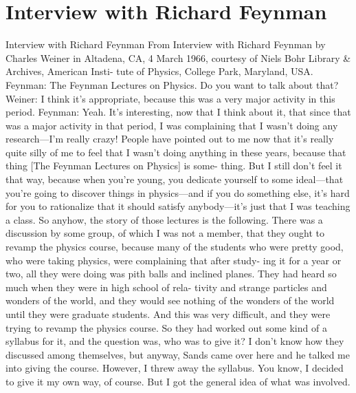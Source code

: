 \documentclass[10pt,oneside]{article}
\begin{document}
\section*{Interview with Richard Feynman}
\label{tips-sec-6-interview-with-richard-feynman}
Interview with Richard Feynman From Interview with Richard Feynman by Charles Weiner in Altadena, CA, 4 March 1966, courtesy of Niels Bohr Library \& Archives, American Insti- tute of Physics, College Park, Maryland, USA. Feynman: The Feynman Lectures on Physics. Do you want to talk about that? Weiner: I think it’s appropriate, because this was a very major activity in this period. Feynman: Yeah. It’s interesting, now that I think about it, that since that was a major activity in that period, I was complaining that I wasn’t doing any research---I’m really crazy! People have pointed out to me now that it’s really quite silly of me to feel that I wasn’t doing anything in these years, because that thing [The Feynman Lectures on Physics] is some- thing. But I still don’t feel it that way, because when you’re young, you dedicate yourself to some ideal---that you’re going to discover things in physics---and if you do something else, it’s hard for you to rationalize that it should satisfy anybody---it’s just that I was teaching a class. So anyhow, the story of those lectures is the following. There was a discussion by some group, of which I was not a member, that they ought to revamp the physics course, because many of the students who were pretty good, who were taking physics, were complaining that after study- ing it for a year or two, all they were doing was pith balls and inclined planes. They had heard so much when they were in high school of rela- tivity and strange particles and wonders of the world, and they would see nothing of the wonders of the world until they were graduate students. And this was very difficult, and they were trying to revamp the physics course. So they had worked out some kind of a syllabus for it, and the question was, who was to give it? I don’t know how they discussed among themselves, but anyway, Sands came over here and he talked me into giving the course. However, I threw away the syllabus. You know, I decided to give it my own way, of course. But I got the general idea of what was involved.\par
\end{document}
